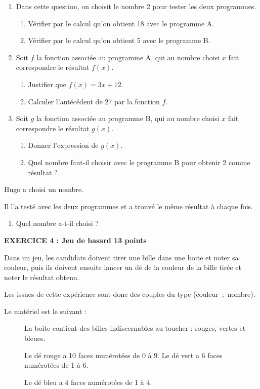 \documentclass[11pt]{article}
\begin{document}
\begin{enumerate}
\item Dans cette question, on choisit le nombre 2 pour tester les deux programmes.
	\begin{enumerate}
		\item Vérifier par le calcul qu'on obtient 18 avec le programme A.
		\item Vérifier par le calcul qu'on obtient 5 avec le programme B.
	\end{enumerate}
\item Soit $f$ la fonction associée au programme A, qui au nombre choisi $x$ fait correspondre
le résultat $f(x)$.
	\begin{enumerate}
		\item Justifier que $f(x) = 3x + 12$.
		\item Calculer l'antécédent de 27 par la fonction $f$.
	\end{enumerate}
\item Soit $g$ la fonction associée au programme B, qui au nombre choisi $x$ fait correspondre le résultat $g(x)$.
	\begin{enumerate}
		\item Donner l'expression de $g(x)$.
		\item Quel nombre faut-il choisir avec le programme B pour obtenir 2 comme résultat ?
		\end{enumerate}
\end{enumerate}
Hugo a choisi un nombre.

Il l'a testé avec les deux programmes et a trouvé le même résultat à chaque fois.

\begin{enumerate}[start=4]
\item Quel nombre a-t-il choisi ?
\end{enumerate}

\bigskip

\textbf{EXERCICE 4 : Jeu de hasard \hfill 13 points}

\medskip

Dans un jeu, les candidats doivent tirer une bille dans une boite et noter sa couleur, puis ils doivent ensuite lancer un dé de la couleur de la bille tirée et noter le résultat obtenu.

Les issues de cette expérience sont donc des couples du type (couleur~;~nombre).

Le matériel est le suivant :

\begin{description}
\item[ ] La boite contient des billes indiscernables au toucher :  { rouges}, { vertes} et  { bleues}.
\item[ ] Le dé rouge a 10 faces numérotées de 0 à 9. Le dé vert a 6 faces numérotées de 1 à 6.
\item[ ] Le dé bleu a 4 faces numérotées de 1 à 4.
\end{description}
\end{document}
